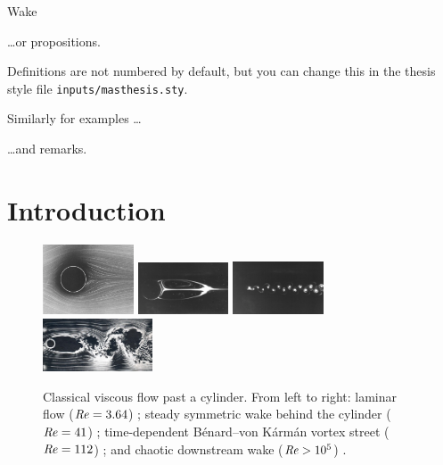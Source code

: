 \begin{chapter}{\label{cha:wake}Wake}
  \begin{proposition}
    \dots or propositions.
  \end{proposition}

  \begin{definition}
    Definitions are not numbered by default, but you can change this in the
    thesis style file \verb"inputs/masthesis.sty".
  \end{definition}

  \begin{example}
    Similarly for examples \ldots
  \end{example}

  \begin{remark}
    \ldots and remarks.
  \end{remark}

\section{Introduction}
\begin{figure}[h]
\centering
  \includegraphics[height=2.08cm,angle=180]{wake/3.png}
  \includegraphics[width=0.24\textwidth,angle=180]{wake/taneda41}
  \includegraphics[width=0.24\textwidth,angle=180]{wake/taneda112}
    \includegraphics[width=0.29\textwidth,angle=180]{wake/turb.jpg}
  \caption{Classical viscous flow past a cylinder. From left to right: laminar flow ($\mbox{\ensuremath{\mathit{Re}}}=3.64$) \cite{taneda41}; steady symmetric wake behind the cylinder ($\mbox{\ensuremath{\mathit{Re}}}=41$) \cite{taneda41}; time-dependent B\'enard--von K\'arm\'an vortex street ($\mbox{\ensuremath{\mathit{Re}}} = 112$) \cite{taneda112}; and chaotic downstream wake ($\mbox{\ensuremath{\mathit{Re}}} > 10^5$) \cite{nagib}.} 

\end{figure}
\end{chapter}
